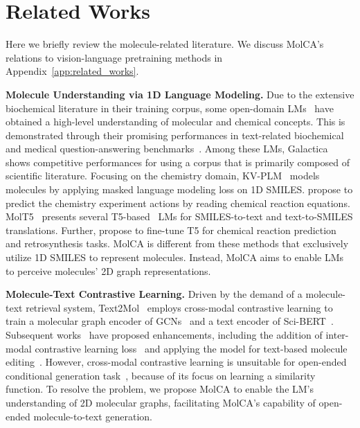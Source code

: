 \documentclass[11pt]{article}
\begin{document}
 \section{Related Works}

 \vspace{-2mm}
Here we briefly review the molecule-related literature. We discuss MolCA's relations to vision-language pretraining methods in Appendix~\ref{app:related_works}.


\textbf{Molecule Understanding via 1D Language Modeling.} Due to the extensive biochemical literature in their training corpus, some open-domain LMs~\cite{OPT,LLama,PALM} have obtained a high-level understanding of molecular and chemical concepts. This is demonstrated through their promising performances in text-related biochemical and medical question-answering benchmarks~\cite{MMLU, PubMedQA}. Among these LMs, Galactica~\cite{Galactica} shows competitive performances for using a corpus that is primarily composed of scientific literature. Focusing on the chemistry domain, KV-PLM~\citep{KVPLM} models molecules by applying masked language modeling loss on 1D SMILES. \citet{Smiles2actions} propose to predict the chemistry experiment actions by reading chemical reaction equations. MolT5~\citep{MolT5} presents several T5-based~\cite{T5} LMs for SMILES-to-text and text-to-SMILES translations. Further, \citet{TextChemT5} propose to fine-tune T5 for chemical reaction prediction and retrosynthesis tasks. MolCA is different from these methods that exclusively utilize 1D SMILES to represent molecules. Instead, MolCA aims to enable LMs to perceive molecules' 2D graph representations.


\textbf{Molecule-Text Contrastive Learning.} Driven by the demand of a molecule-text retrieval system, Text2Mol~\citep{Text2Mol} employs cross-modal contrastive learning to train a molecular graph encoder of GCNs~\cite{GCN} and a text encoder of Sci-BERT~\cite{SciBERT}. Subsequent works~\cite{MoMu, MoleculeSTM, CLAMP} have proposed enhancements, including the addition of inter-modal contrastive learning loss~\citep{MoMu} and applying the model for text-based molecule editing~\citep{MoleculeSTM}. However, cross-modal contrastive learning is unsuitable for open-ended conditional generation task~\cite{Flamingo}, because of its focus on learning a similarity function. 
To resolve the problem, we propose MolCA to enable the LM's understanding of 2D molecular graphs, facilitating MolCA's capability of open-ended molecule-to-text generation.
\end{document}
